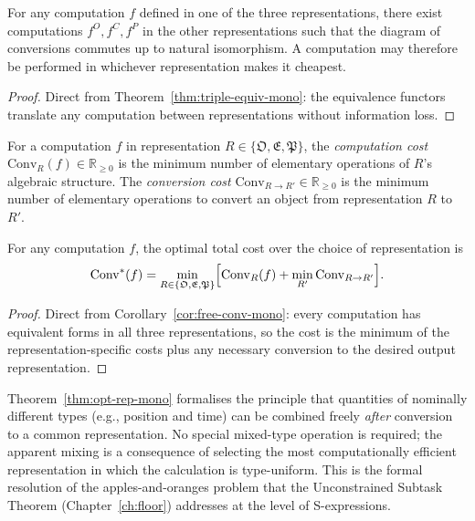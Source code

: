\begin{corollary}\label{cor:free-conv-mono}
For any computation $f$ defined in one of the three representations, there
exist computations $f^O, f^C, f^P$ in the other representations such that the
diagram of conversions commutes up to natural isomorphism.  A computation may
therefore be performed in whichever representation makes it cheapest.
\end{corollary}

\begin{proof}
Direct from Theorem~\ref{thm:triple-equiv-mono}: the equivalence functors
translate any computation between representations without information loss.
\end{proof}

\begin{definition}
\label{def:costs-mono}
For a computation $f$ in representation $R \in \{\mathfrak{O}, \mathfrak{E}, \mathfrak{P}\}$,
the \emph{computation cost} $\mathrm{Conv}_R(f) \in \mathbb{R}_{\geq 0}$ is
the minimum number of elementary operations of $R$'s algebraic structure.
The \emph{conversion cost} $\mathrm{Conv}_{R \to R'} \in \mathbb{R}_{\geq 0}$
is the minimum number of elementary operations to convert an object from
representation $R$ to $R'$.
\end{definition}

\begin{theorem}\label{thm:opt-rep-mono}
For any computation $f$, the optimal total cost over the choice of
representation is
\[
  \mathrm{Conv}^*(f)
  = \min_{R \in \{\mathfrak{O},\mathfrak{E},\mathfrak{P}\}}
    \Bigl[\mathrm{Conv}_R(f)
          + \min_{R'}\mathrm{Conv}_{R \to R'}\Bigr].
\]
\end{theorem}

\begin{proof}
Direct from Corollary~\ref{cor:free-conv-mono}: every computation has
equivalent forms in all three representations, so the cost is the minimum of
the representation-specific costs plus any necessary conversion to the desired
output representation.
\end{proof}

\begin{remark}
Theorem~\ref{thm:opt-rep-mono} formalises the principle that quantities of
nominally different types (e.g., position and time) can be combined freely
\emph{after} conversion to a common representation.  No special mixed-type
operation is required; the apparent mixing is a consequence of selecting the
most computationally efficient representation in which the calculation is
type-uniform.  This is the formal resolution of the apples-and-oranges problem
that the Unconstrained Subtask Theorem (Chapter~\ref{ch:floor}) addresses at
the level of S-expressions.
\end{remark}

